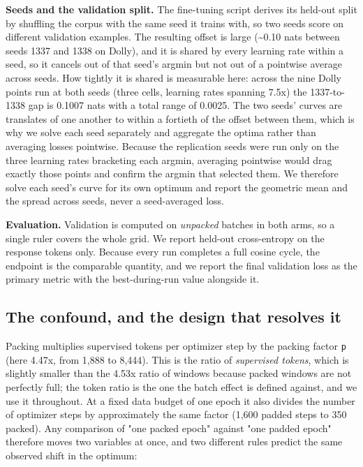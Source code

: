 \documentclass[11pt]{article}
\begin{document}
\textbf{Seeds and the validation split.} The fine-tuning script derives its held-out split by shuffling the corpus with the same seed it trains with, so two seeds score on different validation examples. The resulting offset is large (\textasciitilde{}0.10 nats between seeds 1337 and 1338 on Dolly), and it is shared by every learning rate within a seed, so it cancels out of that seed's argmin but not out of a pointwise average across seeds. How tightly it is shared is measurable here: across the nine Dolly points run at both seeds (three cells, learning rates spanning 7.5x) the 1337-to-1338 gap is 0.1007 nats with a total range of 0.0025. The two seeds' curves are translates of one another to within a fortieth of the offset between them, which is why we solve each seed separately and aggregate the optima rather than averaging losses pointwise. Because the replication seeds were run only on the three learning rates bracketing each argmin, averaging pointwise would drag exactly those points and confirm the argmin that selected them. We therefore solve each seed's curve for its own optimum and report the geometric mean and the spread across seeds, never a seed-averaged loss.

\textbf{Evaluation.} Validation is computed on \emph{unpacked} batches in both arms, so a single ruler covers the whole grid. We report held-out cross-entropy on the response tokens only. Because every run completes a full cosine cycle, the endpoint is the comparable quantity, and we report the final validation loss as the primary metric with the best-during-run value alongside it.

\subsection{The confound, and the design that resolves it}

Packing multiplies supervised tokens per optimizer step by the packing factor \texttt{p} (here 4.47x, from 1,888 to 8,444). This is the ratio of \emph{supervised tokens}, which is slightly smaller than the 4.53x ratio of windows because packed windows are not perfectly full; the token ratio is the one the batch effect is defined against, and we use it throughout. At a fixed data budget of one epoch it also divides the number of optimizer steps by approximately the same factor (1,600 padded steps to 350 packed). Any comparison of "one packed epoch" against "one padded epoch" therefore moves two variables at once, and two different rules predict the same observed shift in the optimum:
\end{document}
